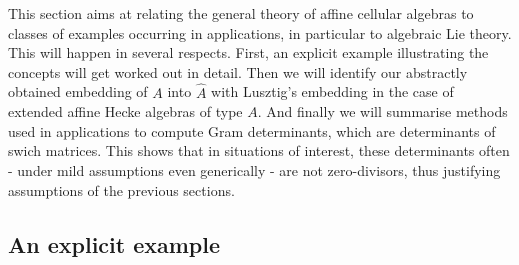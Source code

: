 \documentclass[oneside, a4paper, 11pt]{amsart}
\begin{document}
This section aims at relating the general theory of affine cellular
algebras to classes of examples occurring in applications, in particular
to algebraic Lie theory. This will happen in several respects.
First, an explicit example illustrating the concepts will get worked out
in detail.  Then we will identify our abstractly obtained embedding of $A$ into $\hat{A}$ with
Lusztig's embedding in the case of extended affine Hecke algebras of type $A$.  And finally we will summarise methods used in applications to compute Gram determinants, which
are determinants of swich matrices. This shows that in situations of
interest, these determinants often - under mild assumptions even generically -
are not zero-divisors, thus justifying assumptions of the previous
sections. 

\subsection{An explicit example}
\newcommand{\gs}{s_1}
\newcommand{\gt}{s_2}
\newcommand{\Cs}{C_{\gs}}
\newcommand{\Ct}{C_{\gt}}
\newcommand{\Cst}{C_{\gs\gt}}
\newcommand{\Cts}{C_{\gt\gs}}
\newcommand{\Csts}{C_{\gs\gt\gs}}

\newcommand{\Ts}{t_{\gs}}
\newcommand{\Tt}{t_{\gt}}
\newcommand{\Tst}{t_{\gs\gt}}
\newcommand{\Tts}{t_{\gt\gs}}
\newcommand{\Tsts}{t_{\gs\gt\gs}}
\end{document}
